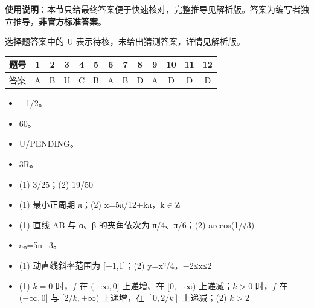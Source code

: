 
\begin{gknotice}
\textbf{使用说明}：本节只给最终答案便于快速核对，完整推导见解析版。答案为编写者独立推导，\textbf{非官方标准答案}。
\end{gknotice}

\begin{gknotice}
选择题答案中的 U 表示待核，未给出猜测答案，详情见解析版。
\end{gknotice}

\begin{center}\begin{tabular}{ccccccccccccc}
\toprule
题号 & 1 & 2 & 3 & 4 & 5 & 6 & 7 & 8 & 9 & 10 & 11 & 12 \\
\midrule
答案 & A & B & U & C & B & A & B & D & A & D & D & D \\
\bottomrule
\end{tabular}\end{center}

\begin{itemize}[leftmargin=2.6em]
  \item[\textbf{13.}] $-$1/2。
  \item[\textbf{14.}] 60。
  \item[\textbf{15.}] U/PENDING。
  \item[\textbf{16.}] 3R。
\end{itemize}

\begin{itemize}[leftmargin=2.6em]
  \item[\textbf{17.}] (1) 3/25；(2) 19/50
  \item[\textbf{18.}] (1) 最小正周期 π；(2) x=5π/12+kπ，k$\in$Z
  \item[\textbf{19.}] (1) 直线 AB 与 α、β 的夹角依次为 π/4、π/6；(2) arccos(1/√3)
  \item[\textbf{20.}] aₙ=5n$-$3。
  \item[\textbf{21.}] (1) 动直线斜率范围为 [$-$1,1]；(2) y=x²/4，$-$2≤x≤2
  \item[\textbf{22.}] (1) $k=0$ 时，$f$ 在 $(-\infty,0]$ 上递增、在 $[0,+\infty)$ 上递减；$k>0$ 时，$f$ 在 $(-\infty,0]$ 与 $[2/k,+\infty)$ 上递增，在 $[0,2/k]$ 上递减；(2) $k>2$
\end{itemize}
